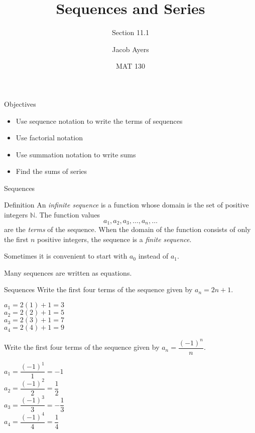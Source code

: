 \documentclass[t]{beamer}
\title[Abbr]{Sequences and Series}
\subtitle{Section 11.1}
\author{Jacob Ayers}
\institute{Lesson \#28}
\date{MAT 130}
\def\N{\mathbb{N}} %
\begin{document}
	
	\begin{frame}
		\titlepage
	\end{frame}
	
	\begin{frame}{Objectives}
		\begin{itemize}
			\item Use sequence notation to write the terms of sequences
			\item Use factorial notation
			\item Use summation notation to write sums
			\item Find the sums of series
		\end{itemize}
	\end{frame}

	\begin{frame}{Sequences}
		\begin{block}{Definition}
			An \textit{infinite sequence} is a function whose domain is the set of positive integers $\N$. The function values $$a_1, a_2, a_3, \dots, a_n, \dots$$ are the \textit{terms} of the sequence. When the domain of the function consists of only the first $n$ positive integers, the sequence is a \textit{finite sequence}.
		\end{block}
	
		Sometimes it is convenient to start with $a_0$ instead of $a_1$.
		
		Many sequences are written as equations.
	\end{frame}

	\begin{frame}{Sequences}
		Write the first four terms of the sequence given by $a_n = 2n + 1$. \pause
		
		$a_1 = 2(1) + 1 = 3$ \\ \pause
		$a_2 = 2(2) + 1 = 5$ \\ \pause
		$a_3 = 2(3) + 1 = 7$ \\ \pause
		$a_4 = 2(4) + 1 = 9$ \\ \pause
		
		Write the first four terms of the sequence given by $a_n = \dfrac{(-1)^n}{n}$. \pause
		
		$a_1 = \dfrac{(-1)^1}{1} = -1$ \\ \pause
		$a_2 = \dfrac{(-1)^2}{2} = \dfrac12$ \\ \pause
		$a_3 = \dfrac{(-1)^3}{3} = -\dfrac13$ \\ \pause
		$a_4 = \dfrac{(-1)^4}{4} = \dfrac14$
	\end{frame}
\end{document}
